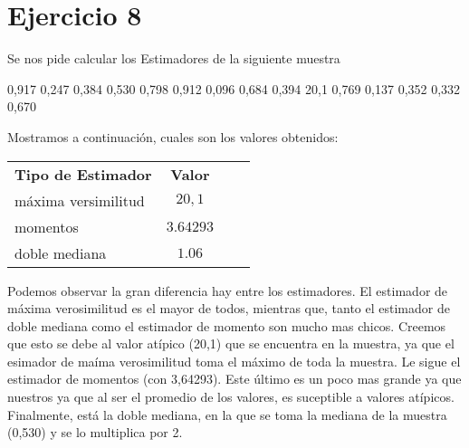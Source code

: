 \section{Ejercicio 8}

Se nos pide calcular los Estimadores de la siguiente muestra

\begin{center}
0,917 0,247 0,384 0,530 0,798 0,912 0,096 0,684 0,394 20,1 0,769 0,137 0,352 0,332 0,670
\end{center}

Mostramos a continuaci\'on, cuales son los valores obtenidos:

\begin{table}[h]
	\centering
	\begin{tabular}{lccc}
		\textbf{Tipo de Estimador} & \textbf{Valor} \\
		m\'axima versimilitud  &  $20,1$ \\
		momentos & $3.64293$ \\
		doble mediana & $1.06$
	\end{tabular}
\end{table}

Podemos observar la gran diferencia hay entre los estimadores. El estimador de m\'axima verosimilitud es el mayor de todos, mientras que, tanto el estimador de doble mediana como el estimador de momento son mucho mas chicos. Creemos que esto se debe al valor at\'ipico (20,1) que se encuentra en la muestra, ya que el esimador de ma\'ima verosimilitud toma el m\'aximo de toda la muestra. Le sigue el estimador de momentos (con 3,64293). Este \'ultimo es un poco mas grande ya que nuestros ya que al ser el promedio de los valores, es suceptible a valores at\'ipicos. Finalmente, est\'a la doble mediana, en la que se toma la mediana de la muestra (0,530) y se lo multiplica por 2. 